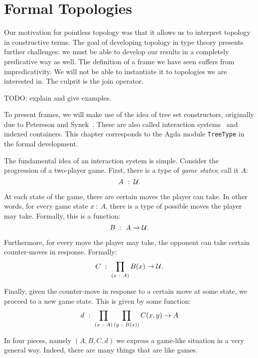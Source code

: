 \chapter{Formal Topologies}\label{chap:formal-topo}

Our motivation for pointless topology was that it allows us to interpret topology in
constructive terms. The goal of developing topology in type theory presents further
challenges: we must be able to develop our results in a completely predicative way as
well. The definition of a frame we have seen suffers from impredicativity. We will not be
able to instantiate it to topologies we are interested in. The culprit is the join
operator.

TODO: explain and give examples.

To present frames, we will make use of the idea of tree set constructors, originally due
to Petersson and Synek~\cite{tree-sets}. These are also called interaction
systems~\cite{hancock-interaction-systems} and indexed containers. This chapter
corresponds to the Agda module \texttt{TreeType} in the formal development.

The fundamental idea of an interaction system is simple. Consider the progression of a
two-player game. First, there is a type of \emph{game states}; call it $A$:
\begin{equation*}
  A~:~\mathcal{U}.
\end{equation*}

At each state of the game, there are certain moves the player can take. In other words,
for every game state $x~:~A$, there is a type of possible moves the player may take.
Formally, this is a function:
\begin{equation*}
  B~:~A \rightarrow \mathcal{U}.
\end{equation*}

Furthermore, for every move the player may take, the opponent can take certain
counter-moves in response. Formally:
\begin{equation*}
  C~:~\prod_{(x~:~A)} B(x) \rightarrow \mathcal{U}.
\end{equation*}

Finally, given the counter-move in response to a certain move at some state, we proceed to
a new game state. This is given by some function:
\begin{equation*}
  d~:~\prod_{(x~:~A)} \prod_{(y~:~B(x))} C(x, y) \rightarrow A
\end{equation*}

In four pieces, namely $(A, B, C, d)$ we express a game-like situation in a very general
way. Indeed, there are many things that are like games.

